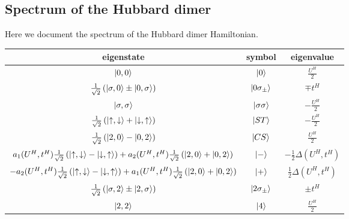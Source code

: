 \documentclass[reprint,hidelinks]{revtex4-2}
\begin{document}
\begin{widetext}
\section{Spectrum of the Hubbard dimer}
Here we document the spectrum of the Hubbard dimer Hamiltonian.
\begin{center}
	\begin{tabular}{|c|c|c|}
	\hline
	eigenstate & symbol & eigenvalue \\
	\hline
	$\ket{0,0}$ & $\ket{0}$ & \( \frac{U^H}{2}\)\\
	$ \frac{1}{\sqrt 2}\left(\ket{\sigma,0} \pm \ket{0,\sigma}\right)$ & $\ket{0\sigma_\pm}$ & \(\mp t^H\)\\
	$\ket{\sigma,\sigma}$ & $\ket{\sigma\sigma}$ & \( -\frac{U^H}{2}\)\\
	$ \frac{1}{\sqrt 2}\left(\ket{\uparrow,\downarrow} + \ket{\downarrow,\uparrow}\right)$ & $\ket{ST}$ & \( -\frac{U^H}{2}\)\\
	$ \frac{1}{\sqrt 2}\left(\ket{2,0} - \ket{0,2}\right)$ & $\ket{CS}$ & \( \frac{U^H}{2}\)\\
	$a_1(U^H, t^H) \frac{1}{\sqrt 2}\left(\ket{\uparrow,\downarrow} - \ket{\downarrow,\uparrow}\right) + a_2(U^H, t^H)\frac{1}{\sqrt 2}\left(\ket{2,0} + \ket{0,2}\right)$ & $\ket{-}$ & \(-\frac{1}{2}\Delta(U^H, t^H)\)\\
	$-a_2(U^H, t^H) \frac{1}{\sqrt 2}\left(\ket{\uparrow,\downarrow} - \ket{\downarrow,\uparrow}\right) + a_1(U^H, t^H)\frac{1}{\sqrt 2}\left(\ket{2,0} + \ket{0,2}\right)$ & $\ket{+}$ & \(\frac{1}{2}\Delta(U^H, t^H)\)\\
	$ \frac{1}{\sqrt 2}\left(\ket{\sigma,2} \pm \ket{2,\sigma}\right)$ & $\ket{2\sigma_\pm}$ & \(\pm t^H\)\\
	$\ket{2,2}$ & $\ket{4}$ & \( \frac{U^H}{2}\)\\
\hline
	\end{tabular}
	\label{hubb_dim_spectrum}
\end{center}


\end{widetext}
\end{document}
